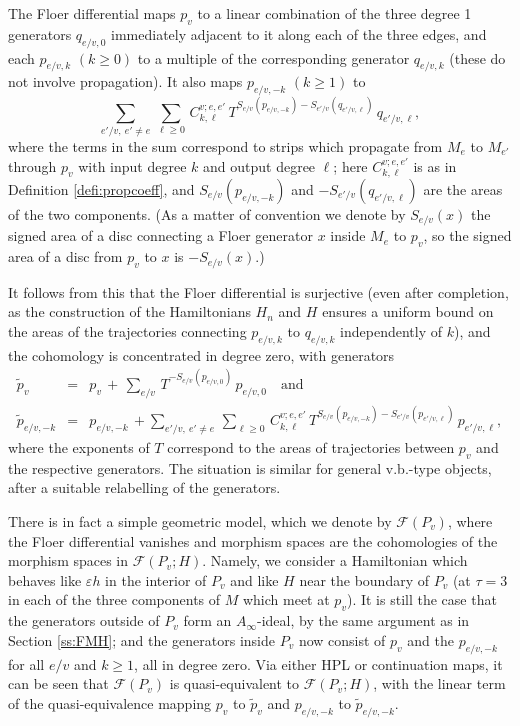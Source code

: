 \documentclass[11pt,leqno]{amsart}
\numberwithin{equation}{section}
\newcommand{\cF}{{\mathcal F}}
\begin{document}
The Floer differential maps $p_v$ to a linear combination of the three
degree 1 generators $q_{e/v,0}$ immediately adjacent to it along each of the
three edges, and each $p_{e/v,k}$ $(k\geq 0)$ to a multiple of the corresponding generator
$q_{e/v,k}$ (these do not involve propagation). It also maps
$p_{e/v,-k}$ $(k\geq 1)$ to 
$$\sum_{e'/v,\ e'\neq e}\, \sum_{\ell\geq 0} \,C^{v;e,e'}_{k,\ell}\,
T^{S_{e/v}(p_{e/v,-k})-S_{e'/v}(q_{e'/v,\ell})}\,q_{e'/v,\ell},$$
where the terms in the sum correspond to strips which propagate from $M_e$ to $M_{e'}$ through $p_v$ with
input degree $k$ and output degree $\ell$; here $C^{v;e,e'}_{k,\ell}$ is as
in Definition \ref{defi:propcoeff}, and $S_{e/v}(p_{e/v,-k})$ and
$-S_{e'/v}(q_{e'/v,\ell})$ are the areas of the two components. (As a matter
of convention we denote by $S_{e/v}(x)$ the signed area of a disc
connecting a Floer generator $x$ inside $M_e$ to $p_v$, so the signed
area of a disc from $p_v$ to $x$ is $-S_{e/v}(x)$.)

It follows from this that the Floer differential is surjective (even after
completion, as the construction of the Hamiltonians $H_n$ and $H$ ensures a
uniform bound on the areas of the trajectories connecting $p_{e/v,k}$ to 
$q_{e/v,k}$ independently of $k$), and the cohomology is concentrated in
degree zero, with generators
\begin{eqnarray}\label{eq:tildepv}
\tilde{p}_v&=&p_v\,+\,\sum_{e/v}\,
T^{-S_{e/v}(p_{e/v,0})}\,p_{e/v,0}\quad \text{and}\\
\label{eq:tildepev}
\tilde{p}_{e/v,-k}&=&p_{e/v,-k}\,+\sum_{e'/v,\ e'\neq e}\, \sum_{\ell\geq 0} \,C^{v;e,e'}_{k,\ell}\,
T^{S_{e/v}(p_{e/v,-k})-S_{e'/v}(p_{e'/v,\ell})}\,p_{e'/v,\ell},
\end{eqnarray}
where the exponents of $T$ correspond to the areas of trajectories between 
$p_v$ and the respective generators. The situation is similar for general
v.b.-type objects, after a suitable relabelling of the generators.

There is in fact a simple geometric model, which we denote by $\cF(P_v)$, 
where the Floer differential vanishes and morphism spaces are the
cohomologies of the morphism spaces in $\cF(P_v;H)$. Namely, we 
consider a Hamiltonian which behaves like $\varepsilon h$ in the interior of
$P_v$ and like $H$ near the boundary of $P_v$ (at $\tau=3$ in each of the three
components of $M$ which meet at $p_v$). It is still the case that
the generators outside of $P_v$ form an $A_\infty$-ideal, by the same argument
as in Section \ref{ss:FMH}; and the generators inside $P_v$ now consist of
$p_v$ and the $p_{e/v,-k}$ for all $e/v$ and $k\geq 1$, all in degree zero. 
Via either HPL or continuation maps, it can be seen that $\cF(P_v)$ is quasi-equivalent to
$\cF(P_v;H)$, with the linear term of the quasi-equivalence mapping $p_v$ to
$\tilde{p}_v$ and $p_{e/v,-k}$ to $\tilde{p}_{e/v,-k}$.
\end{document}
